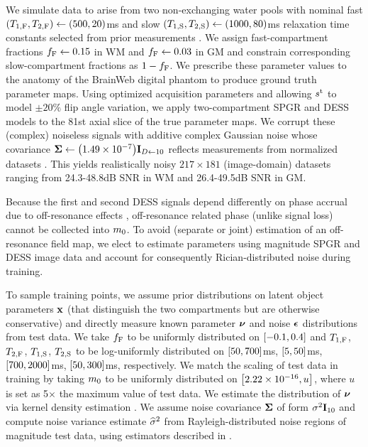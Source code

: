 We simulate data to arise
from two non-exchanging water pools
with nominal fast 
$\paren{\tf{1},\tf{2}} \gets \paren{500,20}$ms
and slow 
$\paren{\ts{1},\ts{2}} \gets \paren{1000,80}$ms
relaxation time constants 
selected from prior measurements 
\cite{mackay:94:ivv,deoni:11:com}.
We assign fast-compartment fractions
$f_{\mathrm{F}} \gets 0.15$ in WM and
$f_{\mathrm{F}} \gets 0.03$ in GM
and constrain corresponding slow-compartment fractions 
as $1-f_{\mathrm{F}}$.
We prescribe these parameter values 
to the anatomy of the BrainWeb digital phantom
\cite{collins:98:dac}
to produce ground truth parameter maps.
Using optimized acquisition parameters
and allowing $s^{\mathrm{t}}$ to model $\pm20\%$ flip angle variation,
we apply two-compartment SPGR and DESS models
to the 81st axial slice of the true parameter maps.
We corrupt these (complex) noiseless signals
with additive complex Gaussian noise
whose covariance $\bmSig \gets \paren{1.49\times10^{-7}} \eye{D\gets10}$
reflects measurements
from normalized datasets \cite{nataraj::oms}.
This yields realistically noisy $217\times181$ (image-domain) datasets
ranging from 24.3-48.8dB SNR in WM
and 26.4-49.5dB SNR in GM.

Because the first and second DESS signals depend differently
on phase accrual due to off-resonance effects \cite{nataraj::oms},
off-resonance related phase (unlike signal loss) 
cannot be collected into $m_0$.
To avoid (separate or joint) estimation
of an off-resonance field map, 
we elect to estimate parameters 
using magnitude SPGR and DESS image data
and account for consequently Rician-distributed noise
during training.

To sample training points, 
we assume prior distributions 
on latent object parameters $\mathbf{x}$
(that distinguish the two compartments
but are otherwise conservative)
and directly measure 
known parameter $\boldsymbol{\nu}$ and noise $\boldsymbol{\epsilon}$ distributions
from test data.
We take $f_{\mathrm{F}}$ to be uniformly distributed
on $\brac{-0.1,0.4}$ 
and $T_{1,\mathrm{F}}$, $T_{2,\mathrm{F}}$, $T_{1,\mathrm{S}}$, $T_{2,\mathrm{S}}$ 
to be log-uniformly distributed
on $\brac{50,700}$ms, $\brac{5,50}$ms, $\brac{700,2000}$ms, $\brac{50,300}$ms,
respectively.
We match the scaling of test data
in training
by taking $m_0$ 
to be uniformly distributed on $\brac{\eps,u}$, 
where $u$ is set as 5$\times$ the maximum value of test data.
We estimate the distribution of $\boldsymbol{\nu}$
via kernel density estimation
\cite{parzen:62:oeo}.
We assume noise covariance $\boldsymbol{\Sigma}$ 
of form $\sigma^2 \mathbf{I}_{10}$
and compute noise variance estimate $\widehat{\sigma}^2$
from Rayleigh-distributed noise regions
of magnitude test data, using estimators described in 
\cite{siddiqui:64:sif}.

